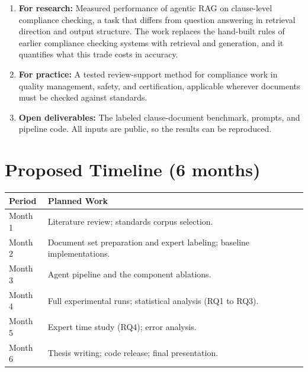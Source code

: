 \documentclass[10pt,a4paper]{article}
\begin{document}
\begin{enumerate}
    \item \textbf{For research:} Measured performance of agentic RAG on clause-level compliance checking, a task that differs from question answering in retrieval direction and output structure. The work replaces the hand-built rules of earlier compliance checking systems \cite{zhang2016} with retrieval and generation, and it quantifies what this trade costs in accuracy.
    \item \textbf{For practice:} A tested review-support method for compliance work in quality management, safety, and certification, applicable wherever documents must be checked against standards.
    \item \textbf{Open deliverables:} The labeled clause-document benchmark, prompts, and pipeline code. All inputs are public, so the results can be reproduced.
\end{enumerate}

\section{Proposed Timeline (6 months)}

\begin{tabularx}{\textwidth}{|p{2.6cm}|X|}
\hline
\rowcolor{lightgray}
\textbf{Period} & \textbf{Planned Work} \\
\hline
Month 1 & Literature review; standards corpus selection. \\
\hline
Month 2 & Document set preparation and expert labeling; baseline implementations. \\
\hline
Month 3 & Agent pipeline and the component ablations. \\
\hline
Month 4 & Full experimental runs; statistical analysis (RQ1 to RQ3). \\
\hline
Month 5 & Expert time study (RQ4); error analysis. \\
\hline
Month 6 & Thesis writing; code release; final presentation. \\
\hline
\end{tabularx}
\end{document}
